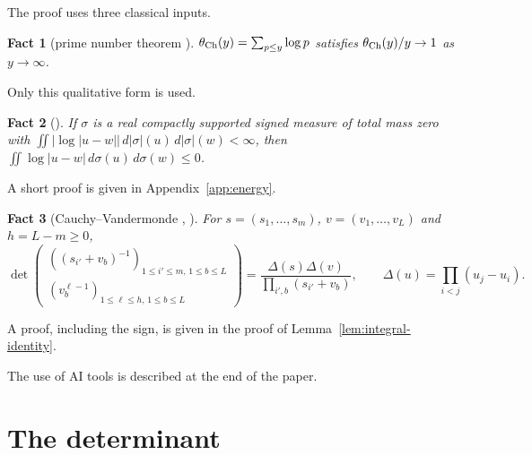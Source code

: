 \documentclass{amsart}
\newtheorem{fact}{Fact}
\numberwithin{equation}{section}
\numberwithin{table}{section}
\begin{document}
The proof uses three classical inputs.

\begin{fact}[prime number theorem {\cite[Theorems~6 and~420, \S\S1.8 and~22.4]{HW}}]\label{fact:pnt}
$\theta_{\rm Ch}(y)=\sum_{p\le y}\log p$ satisfies $\theta_{\rm Ch}(y)/y\to1$
as $y\to\infty$.
\end{fact}
Only this qualitative form is used.

\begin{fact}[{\cite[Lemma~I.1.8]{ST}}]\label{fact:energy}
If $\sigma$ is a real compactly supported signed measure of total mass zero
with $\iint|\log|u-w||\,d|\sigma|(u)\,d|\sigma|(w)<\infty$, then
$\iint\log|u-w|\,d\sigma(u)\,d\sigma(w)\le0$.
\end{fact}
A short proof is given in Appendix~\ref{app:energy}.

\begin{fact}[Cauchy--Vandermonde {\cite[Theorem~25]{Krat}, \cite[Section~2]{HK}}]\label{fact:cv}
For $s=(s_1,\ldots,s_m)$, $v=(v_1,\ldots,v_L)$ and $h=L-m\ge0$,
\[
\det\begin{pmatrix}
((s_{i'}+v_b)^{-1})_{1\le i'\le m,\,1\le b\le L}\\(v_b^{\ell-1})_{1\le\ell\le h,\,1\le b\le L}
\end{pmatrix}
=\frac{\Delta(s)\Delta(v)}{\prod_{i',b}(s_{i'}+v_b)},
\qquad \Delta(u)=\prod_{i<j}(u_j-u_i).
\]
\end{fact}
A proof, including the sign, is given in the proof of
Lemma~\ref{lem:integral-identity}.

The use of AI tools is described at the end of the paper.

\section{The determinant}\label{sec:determinant}
\end{document}
